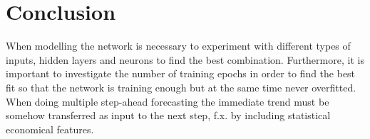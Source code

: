 \section{Conclusion}
When modelling the network is necessary to experiment with different types of inputs, hidden layers and neurons to find the best combination. Furthermore, it is important to investigate the number of training epochs in order to find the best fit so that the network is training enough but at the same time never overfitted. 
When doing multiple step-ahead forecasting the immediate trend must be somehow transferred as input to the next step, f.x. by including statistical economical features.

 